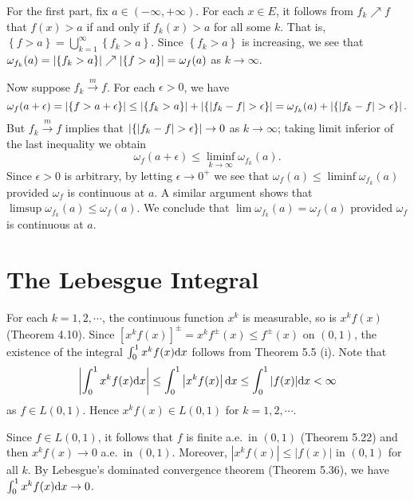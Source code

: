 \begin{exercise}{4.18}
  For the first part, fix $a \in (-\infty, +\infty)$.
  For each $x \in E$,
  it follows from $f_k \nearrow f$ that
  $f(x) > a$ if and only if $f_k(x) > a$ for all some $k$.
  That is, $\left\{ f > a \right\} = \bigcup_{k=1}^{\infty} \left\{ f_k > a \right\}$.
  Since $\left\{ f_k > a \right\}$ is increasing,
  we see that $\omega_{f_k}(a) = \left\vert\left\{ f_k > a \right\}\right\vert \nearrow
  \left\vert\left\{ f > a \right\}\right\vert = \omega_f(a)$ as $k \rightarrow \infty$.

  Now suppose $f_k \xrightarrow{m} f$.
  For each $\epsilon > 0$, we have
  \[
    \omega_f(a + \epsilon) = \left\vert\left\{ f > a + \epsilon \right\}\right\vert \le
    \left\vert\left\{ f_k > a \right\}\right\vert + \left\vert\left\{ \lvert f_k - f \rvert > \epsilon \right\}\right\vert
    = \omega_{f_k}(a) + \left\vert\left\{ \lvert f_k - f \rvert > \epsilon \right\}\right\vert.
  \]
  But $f_k \xrightarrow{m} f$ implies that
  $\left\vert\left\{ \lvert f_k - f \rvert > \epsilon \right\}\right\vert \rightarrow 0$
  as $k \rightarrow \infty$;
  taking limit inferior of the last inequality we obtain
  \[
    \omega_f(a + \epsilon) \le \liminf_{k \rightarrow \infty} \omega_{f_k}(a).
  \]
  Since $\epsilon > 0$ is arbitrary,
  by letting $\epsilon \rightarrow 0^+$ we see that
  $\omega_f(a) \le \liminf \omega_{f_k}(a)$
  provided $\omega_f$ is continuous at $a$.
  A similar argument shows that $\limsup \omega_{f_k}(a) \le \omega_f(a)$.
  We conclude that $\lim \omega_{f_k}(a) = \omega_f(a)$
  provided $\omega_f$ is continuous at $a$.
\end{exercise}

\section{The Lebesgue Integral}

\begin{exercise}{5.4}
  For each $k=1,2,\cdots$, the continuous function $x^k$ is measurable,
  so is $x^kf(x)$ (Theorem 4.10).
  Since $[x^kf(x)]^\pm=x^kf^\pm(x)\leq f^\pm(x)$ on $(0,1)$,
  the existence of the integral $\int_0^1x^kf(x)\mathrm{d} x$ follows from Theorem 5.5 (i).
  Note that
  \[\left|\int_0^1 x^kf(x)\mathrm{d} x\right|\leq\int_0^1\left|x^kf(x)\right|\mathrm{d} x\leq\int_0^1|f(x)|\mathrm{d} x<\infty\]
  as $f\in L(0,1)$.
  Hence $x^kf(x)\in L(0,1)$ for $k=1,2,\cdots$.

  Since $f\in L(0,1)$, it follows that $f$ is finite a.e.\ in $(0,1)$ (Theorem 5.22)
  and then $x^kf(x)\to 0$ a.e.\ in $(0,1)$.
  Moreover, $|x^kf(x)|\leq |f(x)|$ in $(0,1)$ for all $k$.
  By Lebesgue's dominated convergence theorem (Theorem 5.36),
  we have $\int_0^1x^kf(x)\mathrm{d} x\to0$.
\end{exercise}

